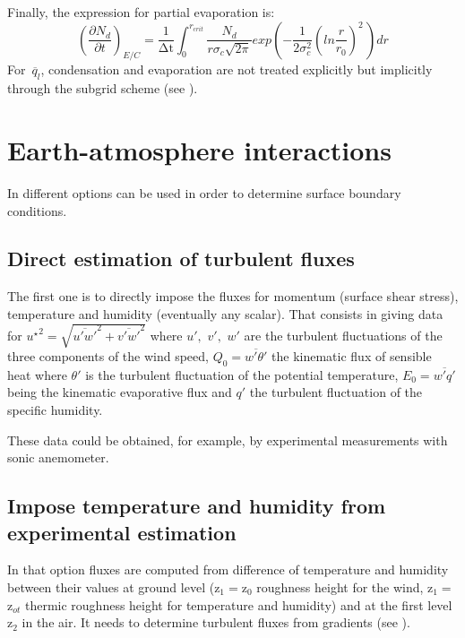 Finally, the expression for partial evaporation is:
\begin{equation}
\left( \frac{\partial N_{d}}{\partial t}
\right)_{E/C}=\frac{1}{\mathrm{\Delta t}}\int_{0}^{r_{crit}}
\frac{N_{d}}{r\sigma_{c}\sqrt {2\pi } } exp\left( -\frac{1}{2\sigma
_{c}^{2}}\left( ln\frac{r}{r_{0}} \right)^{2}\, \right)dr
\end{equation}
For $\overline{{\, q}_{l}}$, condensation and evaporation are not treated
explicitly but implicitly through the subgrid scheme (see \cite{Bouzereau:2007}).

\section{Earth-atmosphere interactions}
In \CS different options can be used in order to
determine surface boundary conditions.

\subsection{Direct estimation of turbulent fluxes}
The first one is to directly impose the fluxes for momentum (surface shear stress), temperature and
humidity (eventually any scalar). That consists in giving data for
${u^{\star}} ^2 =\sqrt {\overline {u'w'}^{2}+\overline {v'w'}^{2}} $ where
$u',\,\,v',\,\,w'$ are the turbulent fluctuations of
the three components of the wind speed,
\newline
\newline
$Q_{0} =\overline{w'\theta'}$ the kinematic flux of sensible heat where
$\theta '$ is the turbulent fluctuation of the potential temperature,
\newline
\newline
$E_{0} =\overline {w'q'} $ being the kinematic
evaporative flux and $q'$ the turbulent fluctuation of the specific
humidity.

These data could be obtained, for example, by experimental
measurements with sonic anemometer.

\subsection{Impose temperature and humidity from experimental estimation}
In that option fluxes are computed from difference of temperature and
humidity between their values at ground level (z$_{1}=$z$_{0}$ roughness
height for the wind, z$_{1}=$z$_{ot}$ thermic roughness height for
temperature and humidity) and at the first level z$_{2}$ in the air.
It needs to determine turbulent fluxes from gradients (see \cite{Musson_Genon:2007}).

